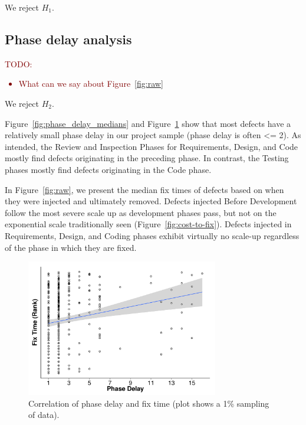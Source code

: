 \documentclass{sig-alternate}
\newcommand{\todo}[1]{\textcolor{Maroon}{TODO: #1}}
\newcommand{\bi}{\begin{itemize}[leftmargin=0.4cm]}
\newcommand{\ei}{\end{itemize}}
\newcommand{\fig}[1]{Figure~\ref{fig:#1}}
\begin{document}
We reject $H_1$.

\subsection{Phase delay analysis}
\todo{
\bi
    \item What can we say about \fig{raw}
\ei
}

We reject $H_2$.


\fig{phase_delay_medians} and \fig{correlation} show that most defects have a relatively small phase delay in our project sample (phase delay is often <= 2). As intended, the Review and Inspection Phases for Requirements, Design, and Code mostly find defects originating in the preceding phase. In contrast, the Testing phases mostly find defects originating in the Code phase. 

In \fig{raw}, we present the median fix times of defects based on when they were injected and ultimately removed. Defects injected Before Development follow the most severe scale up as development phases pass, but not on the exponential scale traditionally seen (\fig{cost-to-fix}). Defects injected in Requirements, Design, and Coding phases exhibit virtually no scale-up regardless of the phase in which they are fixed.







\begin{figure}[!ht]
\begin{center}
\includegraphics[width=3.3in]{corr.pdf}
\end{center}
\caption{Correlation of phase delay and fix time (plot shows a 1\% sampling of data).}
\label{fig:correlation}
\end{figure}
\end{document}
